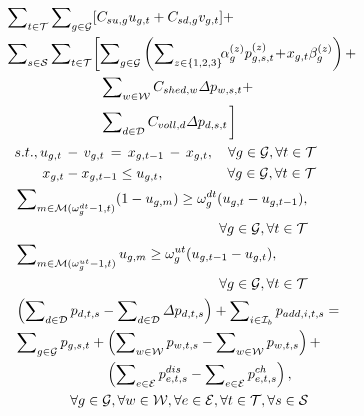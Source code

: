 \documentclass[lettersize,journal]{IEEEtran}
\begin{document}
\vspace{-0.5cm}
\begin{subequations}
\begin{align}
  &\!\!\!\! \sum\nolimits_{t\in\mathcal{T}} \sum\nolimits_{g\in\mathcal{G}} [C_{su, g} u_{g,t} + C_{sd,g} v_{g,t}] + \\
  &\!\!\!\! \sum\nolimits_{s\in\mathcal{S}} \sum\nolimits_{t\in\mathcal{T}}\biggl [ \sum\nolimits_{g\in\mathcal{G}} \left( \sum\nolimits_{z\in\{1,2,3\}} \!\!\alpha_{g}^{(z)} p_{g,s,t}^{(z)} \!+\! x_{g,t} \beta_{g}^{(z)} \right) + \notag\\
    & \qquad \qquad \qquad \left. \sum\nolimits_{w\in\mathcal{W}} C_{shed,w} \varDelta p_{w,s,t} +\right. \notag\\
    & \qquad \qquad \qquad \left. \sum\nolimits_{d\in\mathcal{D}} C_{voll,d} \varDelta p_{d,s,t} \right. \biggr ] \notag\\
    & s.t., u_{g,t} \,-\, v_{g,t} \,=\, x_{g,t-1}\, -\, x_{g,t},\quad \forall g\in\mathcal{G},\forall t\in\mathcal{T}\\
    & \qquad x_{g,t} - x_{g,t-1} \leq u_{g,t}, \,\,\,\quad\quad\qquad \forall g\in\mathcal{G},\forall t\in\mathcal{T}\\
    & \sum\nolimits_{m\in\mathcal{M}(\omega_g^{dt} - 1,t)} (1 - u_{g,m}) \geq \omega_{g}^{dt} (u_{g,t} - u_{g,t-1}), \notag\\
    & \qquad\qquad\qquad\qquad\qquad\qquad\qquad\,\,\,\,  \forall g\in\mathcal{G},\forall t\in\mathcal{T}\\
    & \sum\nolimits_{m\in\mathcal{M}(\omega_g^{ut} - 1,t)} u_{g,m} \geq \omega_{g}^{ut} (u_{g,t-1} - u_{g,t}), \notag\\
    & \qquad\qquad\qquad\qquad\qquad\qquad\qquad\,\,\,\,  \forall g\in\mathcal{G},\forall t\in\mathcal{T}\\
    & \left(\sum\nolimits_{d\in\mathcal{D}} p_{d,t,s} - \sum\nolimits_{d\in\mathcal{D}} \varDelta p_{d,t,s}\right) + \sum\nolimits_{i\in\mathcal{I}_{b}} p_{add, i,t,s}  = \notag\\
    & \sum\nolimits_{g\in\mathcal{G}} p_{g,s,t} +  \left(\sum\nolimits_{w\in\mathcal{W}} p_{w,t,s} - \sum\nolimits_{w\in\mathcal{W}} p_{w,t,s}\right) + \notag \\
    & \qquad\quad\quad\qquad\,\,\, \left(\sum\nolimits_{e\in\mathcal{E}} p_{e,t,s}^{dis} - \sum\nolimits_{e\in\mathcal{E}} p_{e,t,s}^{ch} \right), \notag \\
    & \qquad\qquad \forall g\in\mathcal{G},\forall w\in\mathcal{W},\forall e\in\mathcal{E},\forall t\in\mathcal{T},\forall s\in\mathcal{S} \\

\end{align}
\end{subequations}
\end{document}
